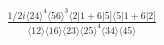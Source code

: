 \documentclass[varwidth, border=5pt]{standalone}
\begin{document}
\begin{my}
$\begin{gathered}
\scriptscriptstyle\frac{1/2i\langle24\rangle^4\langle56\rangle^3\langle2|1+6|5]\langle5|1+6|2]}{\langle12\rangle\langle16\rangle\langle23\rangle\langle25\rangle^4\langle34\rangle\langle45\rangle}
\end{gathered}$
\end{my}
\end{document}
